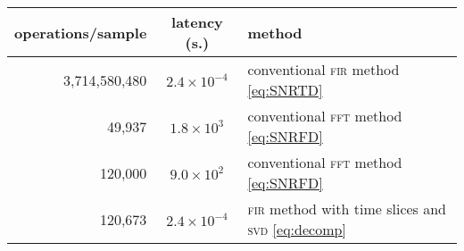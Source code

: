 \begin{tabular}{r c l}
\bf{operations/sample} & \bf{latency (s.)} & \bf{method} \\
\hline
   3,714,580,480 & $2.4 \times 10^{-4}$ & conventional \textsc{fir} method \eqref{eq:SNRTD} \\
          49,937 & $1.8 \times 10^{3}$ & conventional \textsc{fft} method \eqref{eq:SNRFD} \\
         120,000 & $9.0 \times 10^{2}$ & conventional \textsc{fft} method \eqref{eq:SNRFD} \\         
         120,673 & $2.4 \times 10^{-4}$ & \textsc{fir} method with time slices and \textsc{svd} \eqref{eq:decomp}\\
\end{tabular}
